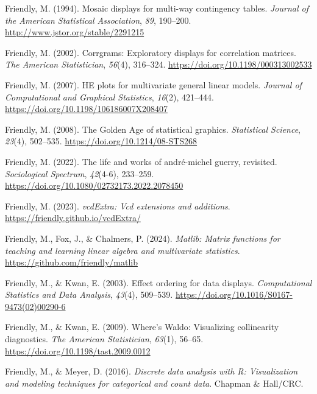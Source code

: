 \documentclass[
  letterpaper,
  10pt,
  krantz2]{krantz}
\newlength{\cslhangindent}
\newenvironment{CSLReferences}[2] %
 {\begin{list}{}{%
  \setlength{\itemindent}{0pt}
  \setlength{\leftmargin}{0pt}
  \setlength{\parsep}{0pt}
  \ifodd #1
   \setlength{\leftmargin}{\cslhangindent}
   \setlength{\itemindent}{-1\cslhangindent}
  \fi
  \setlength{\itemsep}{#2\baselineskip}}}
 {\end{list}}
\begin{document}
\begin{CSLReferences}{1}{0}
Friendly, M. (1994). Mosaic displays for multi-way contingency tables.
\emph{Journal of the American Statistical Association}, \emph{89},
190--200. \url{http://www.jstor.org/stable/2291215}

Friendly, M. (2002). Corrgrams: Exploratory displays for correlation
matrices. \emph{The American Statistician}, \emph{56}(4), 316--324.
\url{https://doi.org/10.1198/000313002533}

Friendly, M. (2007). {HE} plots for multivariate general linear models.
\emph{Journal of Computational and Graphical Statistics}, \emph{16}(2),
421--444. \url{https://doi.org/10.1198/106186007X208407}

Friendly, M. (2008). The {Golden Age} of statistical graphics.
\emph{Statistical Science}, \emph{23}(4), 502--535.
\url{https://doi.org/10.1214/08-STS268}

Friendly, M. (2022). The life and works of andr{é}-michel guerry,
revisited. \emph{Sociological Spectrum}, \emph{42}(4-6), 233--259.
\url{https://doi.org/10.1080/02732173.2022.2078450}

Friendly, M. (2023). \emph{vcdExtra: Vcd extensions and additions}.
\url{https://friendly.github.io/vcdExtra/}

Friendly, M., Fox, J., \& Chalmers, P. (2024). \emph{Matlib: Matrix
functions for teaching and learning linear algebra and multivariate
statistics}. \url{https://github.com/friendly/matlib}

Friendly, M., \& Kwan, E. (2003). Effect ordering for data displays.
\emph{Computational Statistics and Data Analysis}, \emph{43}(4),
509--539. \url{https://doi.org/10.1016/S0167-9473(02)00290-6}

Friendly, M., \& Kwan, E. (2009). Where's {Waldo}: Visualizing
collinearity diagnostics. \emph{The American Statistician},
\emph{63}(1), 56--65. \url{https://doi.org/10.1198/tast.2009.0012}

Friendly, M., \& Meyer, D. (2016). \emph{Discrete data analysis with
{R}: Visualization and modeling techniques for categorical and count
data}. Chapman \& Hall/CRC.


\end{CSLReferences}
\end{document}
